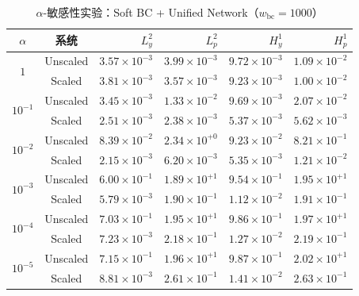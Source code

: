 \begin{table}[H]
  \centering
  \caption{$\alpha$-敏感性实验：Soft BC + Unified Network（$w_{\mathrm{bc}}=1000$）}
  \label{tab:alpha-soft-unified}
  \small
  \begin{tabular}{cc rrrr}
    \toprule
    $\alpha$ & 系统 & $L^2_y$ & $L^2_p$ & $H^1_y$ & $H^1_p$ \\
    \midrule
    \multirow{2}{*}{$1$}
      & Unscaled & $3.57\times10^{-3}$ & $3.99\times10^{-3}$
                 & $9.72\times10^{-3}$ & $1.09\times10^{-2}$ \\
      & Scaled   & $3.81\times10^{-3}$ & $3.57\times10^{-3}$
                 & $9.23\times10^{-3}$ & $1.00\times10^{-2}$ \\
    \midrule
    \multirow{2}{*}{$10^{-1}$}
      & Unscaled & $3.45\times10^{-3}$ & $1.33\times10^{-2}$
                 & $9.69\times10^{-3}$ & $2.07\times10^{-2}$ \\
      & Scaled   & $2.51\times10^{-3}$ & $2.38\times10^{-3}$
                 & $5.37\times10^{-3}$ & $5.62\times10^{-3}$ \\
    \midrule
    \multirow{2}{*}{$10^{-2}$}
      & Unscaled & $8.39\times10^{-2}$ & $2.34\times10^{+0}$
                 & $9.23\times10^{-2}$ & $8.21\times10^{-1}$ \\
      & Scaled   & $2.15\times10^{-3}$ & $6.20\times10^{-3}$
                 & $5.35\times10^{-3}$ & $1.21\times10^{-2}$ \\
    \midrule
    \multirow{2}{*}{$10^{-3}$}
      & Unscaled & $6.00\times10^{-1}$ & $1.89\times10^{+1}$
                 & $9.54\times10^{-1}$ & $1.95\times10^{+1}$ \\
      & Scaled   & $5.79\times10^{-3}$ & $1.90\times10^{-1}$
                 & $1.12\times10^{-2}$ & $1.91\times10^{-1}$ \\
    \midrule
    \multirow{2}{*}{$10^{-4}$}
      & Unscaled & $7.03\times10^{-1}$ & $1.95\times10^{+1}$
                 & $9.86\times10^{-1}$ & $1.97\times10^{+1}$ \\
      & Scaled   & $7.23\times10^{-3}$ & $2.18\times10^{-1}$
                 & $1.27\times10^{-2}$ & $2.19\times10^{-1}$ \\
    \midrule
    \multirow{2}{*}{$10^{-5}$}
      & Unscaled & $7.15\times10^{-1}$ & $1.96\times10^{+1}$
                 & $9.87\times10^{-1}$ & $2.02\times10^{+1}$ \\
      & Scaled   & $8.81\times10^{-3}$ & $2.61\times10^{-1}$
                 & $1.41\times10^{-2}$ & $2.63\times10^{-1}$ \\
    \bottomrule
  \end{tabular}
\end{table}

